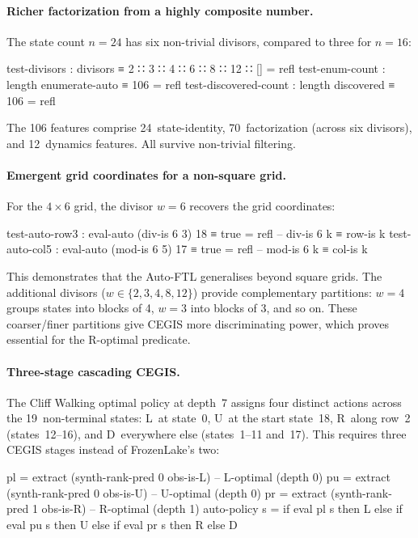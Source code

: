 \paragraph{Richer factorization from a highly composite number.}
The state count $n = 24$ has six non-trivial divisors, compared to three for $n = 16$:

\begin{spec}
test-divisors : divisors ≡ 2 ∷ 3 ∷ 4 ∷ 6 ∷ 8 ∷ 12 ∷ []   = refl
test-enum-count     : length enumerate-auto ≡ 106           = refl
test-discovered-count : length discovered   ≡ 106           = refl
\end{spec}

\noindent The 106 features comprise 24~state-identity, 70~factorization (across six divisors), and 12~dynamics features.  All survive non-trivial filtering.

\paragraph{Emergent grid coordinates for a non-square grid.}
For the $4 \times 6$ grid, the divisor $w = 6$ recovers the grid coordinates:

\begin{spec}
test-auto-row3 : eval-auto (div-is 6 3) 18 ≡ true    = refl   -- div-is 6 k ≡ row-is k
test-auto-col5 : eval-auto (mod-is 6 5) 17 ≡ true    = refl   -- mod-is 6 k ≡ col-is k
\end{spec}

\noindent This demonstrates that the Auto-FTL generalises beyond square grids.  The additional divisors ($w \in \{2, 3, 4, 8, 12\}$) provide complementary partitions: $w = 4$ groups states into blocks of 4, $w = 3$ into blocks of 3, and so on.  These coarser/finer partitions give CEGIS more discriminating power, which proves essential for the R-optimal predicate.

\paragraph{Three-stage cascading CEGIS.}
The Cliff Walking optimal policy at depth~7 assigns four distinct actions across the 19~non-terminal states: L~at state~0, U~at the start state~18, R~along row~2 (states~12--16), and D~everywhere else (states~1--11 and~17).  This requires three CEGIS stages instead of FrozenLake's two:

\begin{spec}
pl = extract (synth-rank-pred 0 obs-is-L)          -- L-optimal (depth 0)
pu = extract (synth-rank-pred 0 obs-is-U)          -- U-optimal (depth 0)
pr = extract (synth-rank-pred 1 obs-is-R)          -- R-optimal (depth 1)
auto-policy s = if eval pl s then L else if eval pu s then U
                else if eval pr s then R else D
\end{spec}

